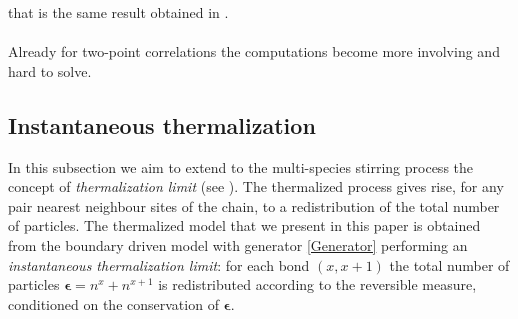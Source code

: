 \documentclass[10pt]{article}
\numberwithin{equation}{section}
\numberwithin{equation}{subsection}
\begin{document}
that is the same result obtained in \cite{vanicat2017exact}. 
\\
\\ Already for two-point correlations the computations become more involving and hard to solve.

\subsection{Instantaneous thermalization}\label{Subsection-Thermalized}
In this subsection we aim to extend to the multi-species stirring process the concept of \textit{thermalization limit} (see \cite{carinci2013duality}). The thermalized process gives rise, for any pair nearest neighbour sites of the chain, to a redistribution of the total number of particles. The thermalized model that we present in this paper is obtained from the boundary driven model with generator \eqref{Generator} performing an \textit{instantaneous thermalization limit}: for each bond $(x,x+1)$ the total number of particles $\bm{\epsilon}=n^{x}+n^{x+1}$ is redistributed according to the reversible measure, conditioned on the conservation of $\bm{\epsilon}$. 
\end{document}
